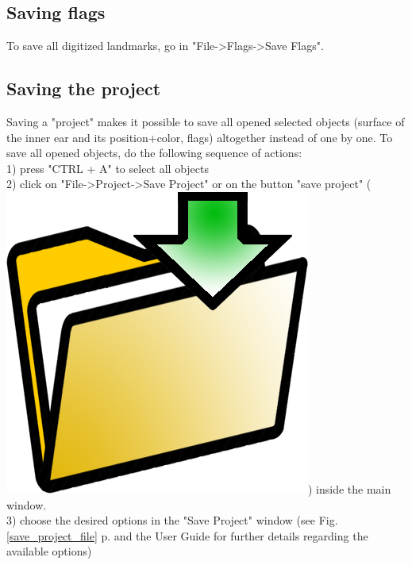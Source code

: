 \documentclass[12pt, a4paper]{book}
\begin{document}
\subsection{Saving flags}
To save all digitized landmarks, go in "File->Flags->Save Flags".

\subsection{Saving the project}
Saving a "project" makes it possible to save all opened selected objects (surface of the inner ear and its position+color, flags) altogether instead of one by one. 
To save all opened objects, do the following sequence of actions:\\
1) press "CTRL + A" to select all objects\\
2) click on "File->Project->Save Project" or on the button "save project" (\includegraphics[scale=0.03]{../images/03/save_data.png})  inside the main window.\\
3) choose the desired options in the "Save Project" window (see Fig. \ref{save_project_file} p.\pageref{save_project_file} and the User Guide for further details regarding the available options)
\end{document}
